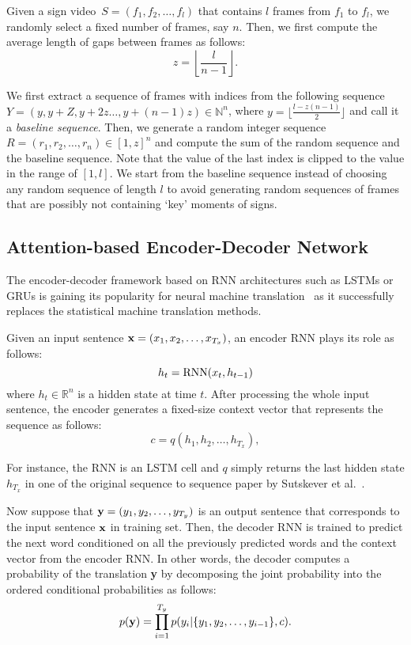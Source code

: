 \documentclass[10pt,twocolumn,letterpaper]{article}
\begin{document}
Given a sign video~$S = (f_1, f_2, \ldots, f_l )$ that contains $l$ frames from $f_1$ to $f_l$, we randomly select a fixed number of frames, say $n$. Then, we first compute the average length of gaps between frames as follows:
\[
z = \left\lfloor\dfrac{l}{n-1}\right\rfloor.
\]

We first extract a sequence of frames with indices from the following sequence $Y =(y, y +Z, y+ 2z \ldots, y + (n-1)z ) \in \mathbb{N}^n$, where $y = \lfloor\frac{l - z(n-1)}{2}\rfloor$ and call it a {\em baseline sequence}. Then, we generate a random integer sequence $R = (r_1,r_2, \ldots, r_n) \in [1,z]^n$ and compute the sum
of the random sequence and the baseline sequence. Note that the value of the last index is clipped to the value in the range of $[1,l]$. We start from the baseline sequence instead of choosing any random sequence of length $l$ to avoid generating random sequences of frames that are possibly not containing `key' moments of signs.


\subsection{Attention-based Encoder-Decoder Network}

The encoder-decoder framework based on RNN architectures such as LSTMs or GRUs is gaining its popularity for neural machine translation~\cite{BahdanauCB14,LuongPM15,SutskeverVL14,VaswaniSPUJGKP17} as it successfully replaces the statistical machine translation methods.

Given an input sentence ${\bf x} = (x_1, x_2, \ldots, x_{T_x})$, an
encoder RNN plays its role as follows:
\[
h_t = {\rm RNN}(x_t, h_{t-1})
\]
where $h_t \in \mathbb{R}^n$ is a hidden state at time $t$. After processing the whole input sentence, the encoder generates a fixed-size context vector that represents the  sequence as follows:
\[
c = q(h_1, h_2, \ldots, h_{T_x}),
\]

For instance, the RNN is an LSTM cell and $q$ simply returns the last hidden state $h_{T_x}$ in one of the original sequence to sequence paper by Sutskever et al.~\cite{SutskeverVL14}.

Now suppose that ${\bf y} = (y_1, y_2, \ldots, y_{T_y})$ is an output sentence that corresponds to the input sentence ${\bf x}$ in training set. Then, the decoder RNN is trained to predict the next word conditioned on all the previously predicted words and the context vector from the encoder RNN. In other words, the decoder computes a probability of the translation {\bf y} by decomposing the joint probability into the ordered conditional probabilities as follows:
\[
p({\bf y}) = \prod_{i=1}^{T_y} p(y_i | \{ y_1, y_2, \ldots, y_{i-1}\}, c).
\]
\end{document}
